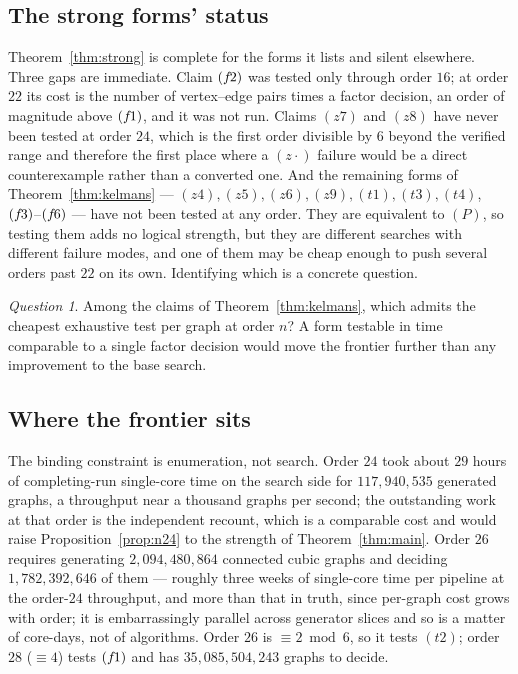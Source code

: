 \documentclass[11pt]{amsart}
\theoremstyle{plain}
\theoremstyle{definition}
\theoremstyle{remark}
\newtheorem{question}[theorem]{Question}
\begin{document}
\subsection{The strong forms' status}\label{ssec:qstrong}
Theorem~\ref{thm:strong} is complete for the forms it lists and silent
elsewhere. Three gaps are immediate. Claim $(f\mkern-2mu2)$ was tested only through
order $16$; at order $22$ its cost is the number of vertex--edge pairs
times a factor decision, an order of magnitude above $(f\mkern-2mu1)$, and it was
not run. Claims $(z7)$ and $(z8)$ have never been tested at order $24$,
which is the first order divisible by $6$ beyond the verified range and
therefore the first place where a $(z\cdot)$ failure would be a direct
counterexample rather than a converted one. And the remaining forms of
Theorem~\ref{thm:kelmans} --- $(z4),(z5),(z6),(z9),(t1),(t3),(t4)$,
$(f\mkern-2mu3)$--$(f\mkern-2mu6)$ --- have not been tested at any order. They are equivalent
to $(P)$, so testing them adds no logical strength, but they are
different searches with different failure modes, and one of them may be
cheap enough to push several orders past $22$ on its own. Identifying
which is a concrete question.

\begin{question}\label{q:cheapest}
Among the claims of Theorem~\ref{thm:kelmans}, which admits the cheapest
exhaustive test per graph at order $n$? A form testable in time
comparable to a single factor decision would move the frontier further
than any improvement to the base search.
\end{question}

\subsection{Where the frontier sits}\label{ssec:qfrontier}
The binding constraint is enumeration, not search. Order $24$ took about
$29$ hours of completing-run single-core time on the search side for
$117{,}940{,}535$ generated graphs, a throughput near a thousand graphs
per second; the outstanding work at that order is the independent
recount, which is a comparable cost and would raise
Proposition~\ref{prop:n24} to the strength of Theorem~\ref{thm:main}.
Order $26$ requires generating $2{,}094{,}480{,}864$ connected cubic
graphs and deciding $1{,}782{,}392{,}646$ of them --- roughly three weeks
of single-core time per pipeline at the order-$24$ throughput, and more
than that in truth, since per-graph cost grows with order; it is
embarrassingly parallel across generator slices and so is a matter of
core-days, not of algorithms. Order $26$ is $\equiv 2 \bmod 6$, so it
tests $(t2)$; order $28$ ($\equiv 4$) tests $(f\mkern-2mu1)$ and has
$35{,}085{,}504{,}243$ graphs to decide.
\end{document}
